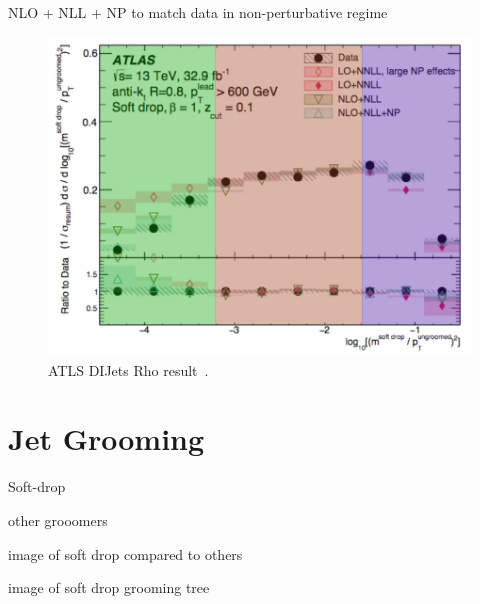 NLO + NLL + NP to match data in non-perturbative regime

\begin{figure}[htb]
\centering
\includegraphics[width=1.0\textwidth]{visuals/ATLAS-rho-highorder.png}
\caption{ATLS DIJets Rho result~\cite{Dreyer:2018nbf}.}
\label{fig:lund}
\end{figure}




\cite{Salam:2009jx}

\cite{Asquith:2018igt}

\section{Jet Grooming}\label{jetgroom:ch1}

Soft-drop

other grooomers

image of soft drop compared to others

image of soft drop grooming tree


